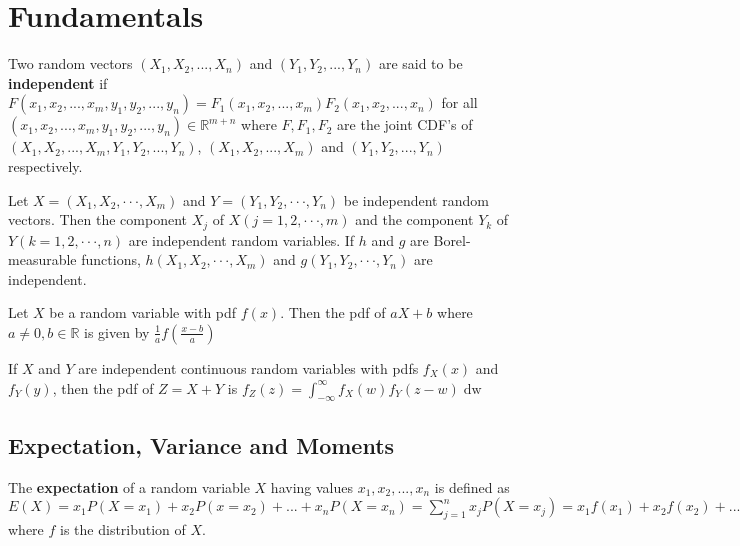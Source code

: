 \section{Fundamentals}

\begin{defn}
    Two random vectors $(X_1, X_2, ..., X_n)$ and $(Y_1, Y_2, ..., Y_n)$ are said to be \textbf{independent} if $F(x_1, x_2, ..., x_m, y_1, y_2, ..., y_n) = F_1 (x_1, x_2, ..., x_m) F_2 (x_1, x_2, ..., x_n)$ for all $(x_1, x_2, ..., x_m, y_1, y_2, ..., y_n) \in \mathbb{R}^{m+n}$ where $F, F_1, F_2$ are the joint CDF's of $(X_1, X_2, ..., X_m, Y_1, Y_2, ..., Y_n)$, $(X_1, X_2, ..., X_m)$ and $(Y_1, Y_2, ..., Y_n)$ respectively.
\end{defn}

\begin{thm}
    Let $X = (X_1, X_2, · · · , X_m)$ and $Y = (Y_1, Y_2, · · · , Y_n)$ be independent random vectors. Then the component $X_j$ of $X(j = 1, 2, · · · , m)$ and the component $Y_k$ of $Y(k = 1, 2, · · · , n)$ are independent random variables. If $h$ and $g$ are Borel-measurable functions, $h(X_1, X_2, · · · , X_m)$ and $g(Y_1, Y_2, · · · , Y_n)$ are independent.
\end{thm}

\begin{thm}
    Let $X$ be a random variable with pdf $f(x)$. Then the pdf of $aX+b$ where $a \neq 0, b \in \mathbb{R}$ is given by $\displaystyle \frac{1}{a} f \left (\frac{x-b}{a} \right)$
\end{thm}

\begin{thm}
    If $X$ and $Y$ are independent continuous random variables with pdfs $f_X(x)$ and $f_Y(y)$, then the pdf of $Z = X+Y$ is $f_Z\left (z\right ) = \displaystyle\int_{- \infty}^\infty f_X \left (w\right ) f_Y \left (z - w\right ) \mathop{\mathrm{d} w}$
\end{thm}


\subsection{Expectation, Variance and Moments}

\begin{defn}
    The \textbf{expectation} of a random variable $X$ having values $x_1, x_2, ..., x_n$ is defined as $E\left (X\right ) = x_1  P\left (X = x_1\right ) + x_2 P\left (x = x_2\right ) + ... + x_n P\left (X = x_n\right ) =  \sum_{j = 1}^n x_j P\left (X = x_j\right ) = x_1 f\left (x_1\right ) + x_2 f\left (x_2\right ) + ... + x_n f\left (x_n\right ) = \sum_{j=1}^n x_j f\left (x_j\right )$ where $f$ is the distribution of $X$.
\end{defn}


